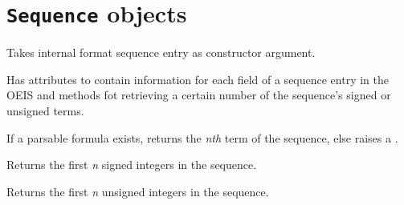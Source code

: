 \documentclass[letterpaper,10pt,english]{sphinxmanual}
\begin{document}
\section{\texttt{Sequence} objects}
\label{api:sequence-objects}

\begin{fulllineitems}
\label{api:sequence.Sequence}
Takes internal format sequence entry as constructor argument.

Has attributes to contain information for each field of a
sequence entry in the OEIS and methods fot retrieving a certain
number of the sequence's signed or unsigned terms.

\begin{fulllineitems}
\label{api:Sequence.generate}
If a parsable formula exists, returns the \emph{nth} term of the sequence, else
raises a {\hyperref[api:errors.NoFunctionError]{\emph{}}}.

\end{fulllineitems}


\begin{fulllineitems}
\label{api:sequence.Sequence.signed}
Returns the first \emph{n} signed integers in the sequence.

\end{fulllineitems}


\begin{fulllineitems}
\label{api:sequence.Sequence.unsigned}
Returns the first \emph{n} unsigned integers in the sequence.

\end{fulllineitems}


\end{fulllineitems}
\end{document}

